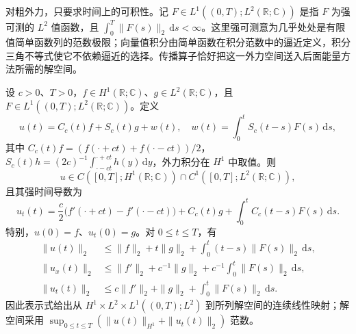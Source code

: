 \ProseParagraphBreak

对粗外力，只要求时间上的可积性。记 \(F\in L^1((0,T);L^2(\mathbb R;\mathbb C))\) 是指 \(F\) 为强可测的 \(L^2\) 值函数，且 \(\int_0^T\|F(s)\|_2\,\mathrm{d}s<\infty\)。这里强可测意为几乎处处是有限值简单函数列的范数极限；向量值积分由简单函数在积分范数中的逼近定义，积分三角不等式使它不依赖逼近的选择。传播算子恰好把这一外力空间送入后面能量方法所需的解空间。

\begin{corollary}[表示式的正则性与数据连续依赖]\label{b2:cor:09-propagator-regularity}
设 \(c>0\)、\(T>0\)，\(f\in H^1(\mathbb R;\mathbb C)\)、\(g\in L^2(\mathbb R;\mathbb C)\)，且 \(F\in L^1((0,T);L^2(\mathbb R;\mathbb C))\)。定义
\[
 u(t)=C_c(t)f+S_c(t)g+w(t),\quad
 w(t)=\int_0^tS_c(t-s)F(s)\,\mathrm{d}s,
\]
其中 \(C_c(t)f=(f(\cdot+ct)+f(\cdot-ct))/2\)，\(S_c(t)h=(2c)^{-1}\int_{\cdot-ct}^{\cdot+ct}h(y)\,\mathrm{d}y\)，外力积分在 \(H^1\) 中取值。则
\[
 u\in C([0,T];H^1(\mathbb R;\mathbb C))\cap C^1([0,T];L^2(\mathbb R;\mathbb C)),
\]
且其强时间导数为
\[
 u_t(t)=\frac c2\bigl(f'(\cdot+ct)-f'(\cdot-ct)\bigr)
       +C_c(t)g+\int_0^tC_c(t-s)F(s)\,\mathrm{d}s.
\]
特别，\(u(0)=f\)、\(u_t(0)=g\)。对 \(0\leq t\leq T\)，有
\[
 \begin{aligned}
 \|u(t)\|_2&\leq\|f\|_2+t\|g\|_2
               +\int_0^t(t-s)\|F(s)\|_2\,\mathrm{d}s,\\
 \|u_x(t)\|_2&\leq\|f'\|_2+c^{-1}\|g\|_2
               +c^{-1}\int_0^t\|F(s)\|_2\,\mathrm{d}s,\\
 \|u_t(t)\|_2&\leq c\|f'\|_2+\|g\|_2
               +\int_0^t\|F(s)\|_2\,\mathrm{d}s.
 \end{aligned}
\]
因此表示式给出从 \(H^1\times L^2\times L^1((0,T);L^2)\) 到所列解空间的连续线性映射；解空间采用 \(\sup_{0\leq t\leq T}(\|u(t)\|_{H^1}+\|u_t(t)\|_2)\) 范数。
\end{corollary}
